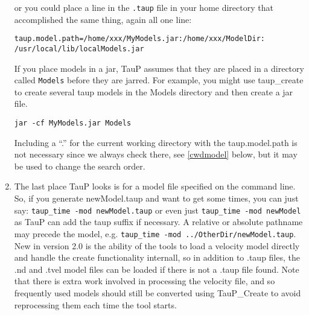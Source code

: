 \begin{enumerate}
or you could place a line in the \texttt{.taup} file in your home directory
that accomplished the same thing, again all one line:

\begin{verbatim}
taup.model.path=/home/xxx/MyModels.jar:/home/xxx/ModelDir:
/usr/local/lib/localModels.jar
\end{verbatim}

If you place models in a jar, TauP assumes that they are placed
in a directory called \texttt{Models} before they are jarred.
For example, you might
use taup\_create to create several taup models in the Models directory
and then create a jar file.

\texttt{jar -cf MyModels.jar Models}

Including a ``.'' for the current working directory with the taup.model.path
is not necessary since we
always check there, see \ref{cwdmodel} below, but it may be used to
change the search order.

\item \label{cwdmodel} The last place TauP looks is for a model file specified
on the command line.
So, if you generate newModel.taup and want to get some times, you can just say:
\texttt{taup\_time -mod newModel.taup}
or even just
\texttt{taup\_time -mod newModel}
as TauP can add the taup suffix if necessary. A relative or absolute pathname
may precede the model, e.g.
\texttt{taup\_time -mod ../OtherDir/newModel.taup}.
New in version 2.0 is the ability of the tools to load a velocity model directly
and handle the create functionality internall, so in addition to .taup files,
the .nd and .tvel model files can be loaded if there is not a .taup file found.
Note that there is extra work involved in processing the velocity file, and so
frequently used models should still be converted using TauP\_Create to avoid
reprocessing them each time the tool starts.

\end{enumerate}
